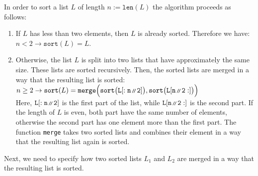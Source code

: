 In order to sort a list $L$ of length $n := \mathtt{len}(L)$ the algorithm proceeds as follows:
\begin{enumerate}
\item If $L$ has less than two elements, then $L$ is already sorted.  Therefore we have: 
      \\[0.2cm]
      \hspace*{1.3cm}
      $n < 2 \rightarrow \mathtt{sort}(L) = L$.
\item Otherwise, the list $L$ is split into two lists that have approximately the same size.
      These lists are sorted recursively.  Then, the sorted lists are merged in a way that the
      resulting list is sorted: \\[0.2cm]
      \hspace*{1.3cm} 
      $n \geq 2 \rightarrow \mathtt{sort}(L) =
         \mathtt{merge}\Bigl(\mathtt{sort}\bigl(\mathtt{L[:n\mbox{\scriptsize\,\texttt{/}$\!$\texttt{/}\,} 2]}\bigr),
         \mathtt{sort}\bigl(\mathtt{L[n\mbox{\scriptsize\,\texttt{/}$\!$\texttt{/}\,} 2:]}\bigr)\Bigr)
     $
     \\[0.2cm]
     Here,  $\mathtt{L[:n\mbox{\scriptsize\,\texttt{/}$\!$\texttt{/}\,} 2]}$ is the first part of the list, while
     $\mathtt{L[n\mbox{\scriptsize\,\texttt{/}$\!$\texttt{/}\,} 2:]}$ is the second part.  If the length of $L$ is even, both part have the same number of
     elements, otherwise the second part has one element more than the first part.  The function \texttt{merge}
     takes two sorted lists and combines their element in a way that the resulting list again is sorted.
\end{enumerate}
Next, we need to specify how two sorted lists $L_1$ and $L_2$ are merged in a way that the resulting list
is sorted.
